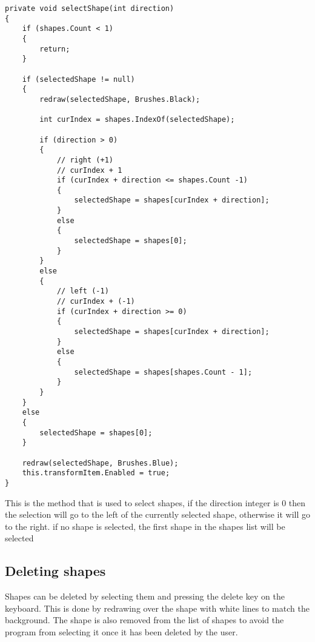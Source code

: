\documentclass[8pt, openany]{extreport}
\begin{document}
\begin{lstlisting}
private void selectShape(int direction)
{
    if (shapes.Count < 1)
    {
        return;
    }

    if (selectedShape != null)
    {
        redraw(selectedShape, Brushes.Black);

        int curIndex = shapes.IndexOf(selectedShape);

        if (direction > 0)
        {
            // right (+1)
            // curIndex + 1
            if (curIndex + direction <= shapes.Count -1)
            {
                selectedShape = shapes[curIndex + direction];
            }
            else
            {
                selectedShape = shapes[0];
            }
        }
        else
        {
            // left (-1)
            // curIndex + (-1)
            if (curIndex + direction >= 0)
            {
                selectedShape = shapes[curIndex + direction];
            }
            else
            {
                selectedShape = shapes[shapes.Count - 1];
            }
        }
    }
    else
    {
        selectedShape = shapes[0];
    }

    redraw(selectedShape, Brushes.Blue);
    this.transformItem.Enabled = true;
}
\end{lstlisting}

This is the method that is used to select shapes, if the direction integer is 0 then the selection will go to the left of the currently selected shape, otherwise it will go to the right. if no shape is selected, the first shape in the shapes list will be selected

		\subsection{Deleting shapes}
Shapes can be deleted by selecting them and pressing the delete key on the keyboard. This is done by redrawing over the shape with white lines to match the background. The shape is also removed from the list of shapes to avoid the program from selecting it once it has been deleted by the user.
\end{document}
